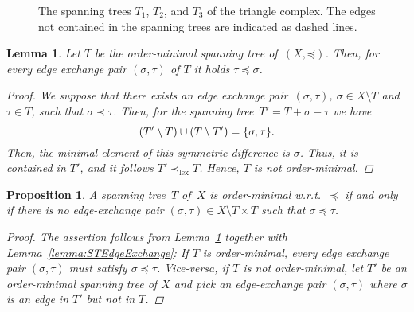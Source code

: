 \documentclass[oneside]{amsart}
\newtheorem{proposition}[theorem]{Proposition}
\newtheorem{lemma}[theorem]{Lemma}
\theoremstyle{definition}
\newcommand\lex{\mathrm{lex}}
\begin{document}
\begin{figure}
    \centering
    
    \caption{The spanning trees $T_1$, $T_2$, and $T_3$ of the triangle complex. The edges not contained in the spanning trees are indicated as dashed lines.}
    \label{figure:TriangleSpanningTrees}
\end{figure}

\begin{lemma}%
    \label{lemma:OrderMinimalEdgeExchange}
    Let $T$ be the order-minimal spanning tree of~$(X, \mathord\preceq)$.
    Then, for every edge exchange pair $(\sigma, \tau)$ of $T$ it holds $\tau \preceq \sigma$.

    \begin{proof}
        We suppose that there exists an edge exchange pair~$(\sigma, \tau)$, $\sigma \in X \setminus T$ and $\tau \in T$, such that $\sigma \prec \tau$.
        Then, for the spanning tree~$T' = T + \sigma - \tau$ we have
        \[ (T' \setminus T) \cup (T \setminus T') = \{ \sigma, \tau \} \text. \]
        Then, the minimal element of this symmetric difference is $\sigma$.
        Thus, it is contained in $T'$, and it follows $T' \prec_\lex T$.
        Hence, $T$ is not order-minimal.
    \end{proof}    
\end{lemma}

\begin{proposition}%
    \label{proposition:OrderMinimalCharacterization}
    A spanning tree~$T$ of~$X$ is order-minimal w.r.t.\ $\preceq$ if and only if there is no edge-exchange pair $(\sigma, \tau) \in X \setminus T \times T$ such that $\sigma \preceq \tau$.

    \begin{proof}
        The assertion follows from Lemma~\ref{lemma:OrderMinimalEdgeExchange} together with Lemma~\ref{lemma:STEdgeExchange}:
        If $T$ is order-minimal, every edge exchange pair $(\sigma, \tau)$ must satisfy $\sigma \preceq \tau$.
        Vice-versa, if $T$ is not order-minimal, let $T'$ be an order-minimal spanning tree of $X$ and pick an edge-exchange pair $(\sigma, \tau)$ where $\sigma$ is an edge in $T'$ but not in $T$.
    \end{proof}    
\end{proposition}
\end{document}

